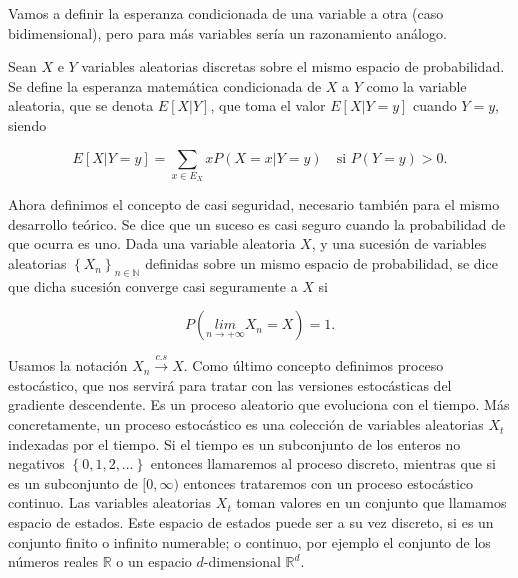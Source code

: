 Vamos a definir la esperanza condicionada de una variable a otra (caso bidimensional), pero para más variables sería un razonamiento análogo.

\begin{definicion}
	Sean $X$ e $Y$ variables aleatorias discretas sobre el mismo espacio de probabilidad. Se define la esperanza matemática condicionada de $X$ a $Y$ como la variable aleatoria, que se denota $E[X|Y]$, que toma el valor $E[X|Y=y]$ cuando $Y=y$, siendo 

\begin{equation}
	E[X|Y=y] = \sum_{x \in E_X} xP(X=x | Y=y) \quad \text{si } P(Y=y)>0.
\end{equation}
\end{definicion}

Ahora definimos el concepto de casi seguridad, necesario también para el mismo desarrollo teórico. Se dice que un suceso es casi seguro cuando la probabilidad de que ocurra es uno. Dada una variable aleatoria $X$, y una sucesión de variables aleatorias $\left \{ X_n \right \} _{n \in \mathbb{N}}$ definidas sobre un mismo espacio de probabilidad, se dice que dicha sucesión converge casi seguramente a $X$ si 

\begin{equation*}
	P \left ( \underset{n \rightarrow + \infty}{lim} X_n =X \right ) =1.
\end{equation*}

Usamos la notación $X_n \overset{c.s}{\rightarrow} X$. Como último concepto definimos proceso estocástico, que nos servirá para tratar con las versiones estocásticas del gradiente descendente. Es un proceso aleatorio que evoluciona con el tiempo. Más concretamente, un proceso estocástico es una colección de variables aleatorias $X_t$ indexadas por el tiempo. Si el tiempo es un subconjunto de los enteros no negativos $\left \{ 0,1,2, \ldots \right \}$ entonces llamaremos al proceso discreto, mientras que si es un subconjunto de $[0, \infty )$ entonces trataremos con un proceso estocástico continuo. Las variables aleatorias $X_t$ toman valores en un conjunto que llamamos espacio de estados. Este espacio de estados puede ser a su vez discreto, si es un conjunto finito o infinito numerable; o continuo, por ejemplo el conjunto de los números reales $\mathbb{R}$ o un espacio $d$-dimensional $\mathbb{R}^d$.